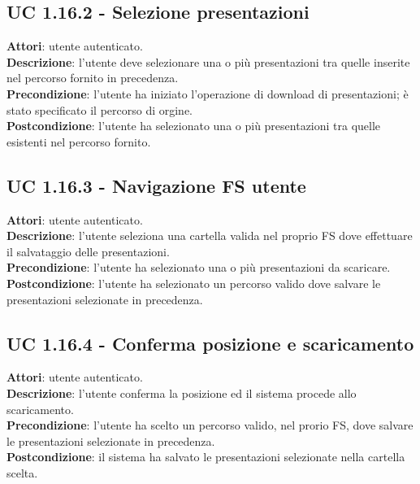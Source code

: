 	\subsection{UC 1.16.2 - Selezione presentazioni}{
		\label{uc1.16.2}
		\textbf{Attori}: utente autenticato. \\
		\textbf{Descrizione}: l'utente deve selezionare una o più presentazioni tra quelle inserite nel percorso fornito in precedenza. \\
		\textbf{Precondizione}: l'utente ha iniziato l'operazione di download di presentazioni; è stato specificato il percorso di orgine.	\\
		\textbf{Postcondizione}: l'utente ha selezionato una o più presentazioni tra quelle esistenti nel percorso fornito.	\\
		}
	\subsection{UC 1.16.3 - Navigazione FS utente}{
		\label{uc1.16.3}
		\textbf{Attori}: utente autenticato. \\
		\textbf{Descrizione}: l'utente seleziona una cartella valida nel proprio FS dove effettuare il salvataggio delle presentazioni. \\
		\textbf{Precondizione}: l'utente ha selezionato una o più presentazioni da scaricare.	\\
		\textbf{Postcondizione}: l'utente ha selezionato un percorso valido dove salvare le presentazioni selezionate in precedenza.	\\
		}
	\subsection{UC 1.16.4 - Conferma posizione e scaricamento}{
		\label{uc1.16.4}
		\textbf{Attori}: utente autenticato. \\
		\textbf{Descrizione}: l'utente conferma la posizione ed il sistema procede allo scaricamento. \\
		\textbf{Precondizione}: l'utente ha scelto un percorso valido, nel prorio FS, dove salvare le presentazioni selezionate in precedenza.	\\
		\textbf{Postcondizione}: il sistema ha salvato le presentazioni selezionate nella cartella scelta.	\\
		}